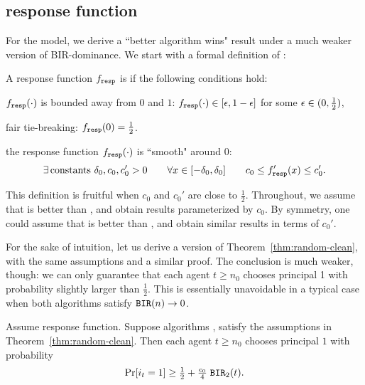 \subsection{\SoftMaxRandom response function}
\label{sec:theory-SoftMax}

For the \SoftMaxRandom model, we derive a ``better algorithm wins" result under a much weaker version of BIR-dominance. We start with a formal definition of \SoftMaxRandom:

\begin{definition}\label{def:SoftMax}
A response function $f_{\mathtt{resp}}$ is \SoftMaxRandom if the following conditions hold:
\begin{OneLiners}
\item  $f_{\mathtt{resp}}(\cdot)$ is bounded away from $0$ and $1$:
    $f_{\mathtt{resp}}(\cdot)\in [\epsilon,1-\epsilon]$ for some $\epsilon\in (0,\tfrac12)$,
\item fair tie-breaking: $f_{\mathtt{resp}}(0)=\tfrac12$.
\item  the response function
 $f_{\mathtt{resp}}(\cdot)$ is ``smooth" around $0$:
 \begin{align}\label{eq:SoftMax-smooth}
 \exists\, \text{constants $\delta_0,c_0,c'_0>0$}
    \qquad \forall x\in [-\delta_0,\delta_0] \qquad
    c_0 \leq f_{\mathtt{resp}}'(x) \leq c'_0.
 \end{align}
\end{OneLiners}
\end{definition}

\begin{remark}
This definition is fruitful when $c_0$ and $c_0'$ are close to $\tfrac12$. Throughout, we assume that \alg[1] is better than \alg[2], and obtain results parameterized by $c_0$. By symmetry, one could assume that \alg[2] is better than \alg[1], and obtain similar results in terms of $c_0'$.
\end{remark}

For the sake of intuition, let us derive a version of Theorem~\ref{thm:random-clean}, with the same assumptions and a similar proof. The conclusion is much weaker, though: we can only guarantee that each agent $t\geq n_0$ chooses principal 1 with probability slightly larger than $\tfrac12$. This is essentially unavoidable in a typical case when both algorithms satisfy $\mathtt{BIR}(n)\to 0$.

\begin{theorem}\label{thm:SoftMax-weak}
Assume \SoftMaxRandom response function.  Suppose algorithms \alg[1], \alg[2] satisfy the assumptions in Theorem~\ref{thm:random-clean}. Then each agent
  $t\geq n_0$ chooses principal $1$ with probability
\begin{align}\label{eq:thm:SoftMax-weak}
     \Pr[i_t = 1]\geq \tfrac12 +  \tfrac{c_0}{4}\; \mathtt{BIR}_2(t).
\end{align}
\end{theorem}

